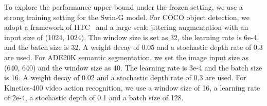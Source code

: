 \documentclass{article}
\begin{document}
To explore the performance upper bound under the frozen setting, we use a strong training setting for the Swin-G model.
For COCO object detection, we adopt a framework of HTC~\cite{chen2019htc,liu2021swin} and a large scale jittering augmentation with an input size of (1024, 1024). The window size is set as 32, the learning rate is 6e-4, and the batch size is 32. A weight decay of 0.05 and a stochastic depth rate of 0.3 are used.
For ADE20K semantic segmentation, we set the image input size as (640, 640) and the window size as 40. The learning rate is 3e-4 and the batch size is 16. A weight decay of 0.02 and a stochastic depth rate of 0.3 are used.
For Kinetics-400 video action recognition, we use a window size of 16, a learning rate of 2e-4, a stochastic depth of 0.1 and a batch size of 128. 
\end{document}
